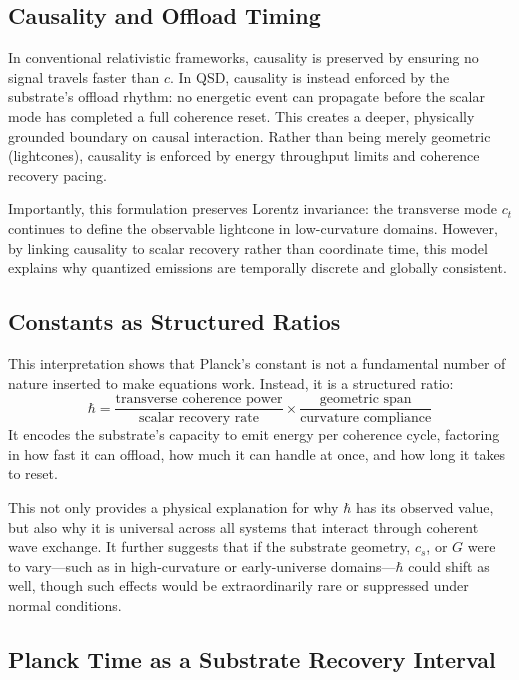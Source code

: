 \documentclass[ht-mathphys]{ht-fmt}
\theoremstyle{thmstyleone}%
\theoremstyle{thmstyletwo}%
\theoremstyle{thmstylethree}%
\begin{document}
\subsection{Causality and Offload Timing}

In conventional relativistic frameworks, causality is preserved by ensuring no signal travels faster than $c$. In QSD, causality is instead enforced by the substrate’s offload rhythm: no energetic event can propagate before the scalar mode has completed a full coherence reset. This creates a deeper, physically grounded boundary on causal interaction. Rather than being merely geometric (lightcones), causality is enforced by energy throughput limits and coherence recovery pacing.

Importantly, this formulation preserves Lorentz invariance: the transverse mode $c_t$ continues to define the observable lightcone in low-curvature domains. However, by linking causality to scalar recovery rather than coordinate time, this model explains why quantized emissions are temporally discrete and globally consistent.

\subsection{Constants as Structured Ratios}

This interpretation shows that Planck’s constant is not a fundamental number of nature inserted to make equations work. Instead, it is a structured ratio:
\[
\hbar = \frac{\text{transverse coherence power}}{\text{scalar recovery rate}} \times \frac{\text{geometric span}}{\text{curvature compliance}}
\]
It encodes the substrate’s capacity to emit energy per coherence cycle, factoring in how fast it can offload, how much it can handle at once, and how long it takes to reset.

This not only provides a physical explanation for why $\hbar$ has its observed value, but also why it is universal across all systems that interact through coherent wave exchange. It further suggests that if the substrate geometry, $c_s$, or $G$ were to vary—such as in high-curvature or early-universe domains—$\hbar$ could shift as well, though such effects would be extraordinarily rare or suppressed under normal conditions.

\subsection{Planck Time as a Substrate Recovery Interval}
\end{document}
